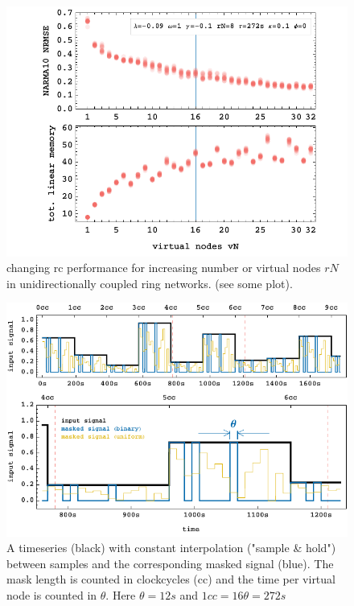 	\begin{figure}
	\centering
	\includegraphics[width=15cm]{pics/vNplot}
	\caption{changing rc performance for increasing number or virtual nodes $rN$ in unidirectionally coupled ring networks. (see some plot).}
		\label{fig:vN_1-32}
	\end{figure}


\begin{figure}
	\centering
	\includegraphics[width=15cm]{pics/signal_mask_vis}
	\caption{A timeseries (black) with constant interpolation ("sample \& hold") between samples and the corresponding masked signal (blue). The mask length is counted in clockcycles (cc) and the time per virtual node is counted in $\theta$. Here $\theta = 12s$ and $1cc = 16 \theta = 272s $}
	\label{fig:signal_mask_vis}
\end{figure}

